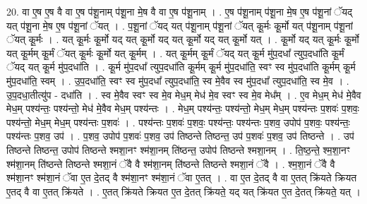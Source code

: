 \documentclass[17pt]{extarticle}
\begin{document}
20. वा ए॒ष ए॒ष वै वा ए॒ष प॑शू॒नाम् प॑शू॒ना मे॒ष वै वा ए॒ष प॑शू॒नाम् । . ए॒ष प॑शू॒नाम् प॑शू॒ना मे॒ष ए॒ष प॑शू॒नां ॅयद् यत् प॑शू॒ना मे॒ष ए॒ष प॑शू॒नां ॅयत् । . प॒शू॒नां ॅयद् यत् प॑शू॒नाम् प॑शू॒नां ॅयत् कू॒र्मः कू॒र्मो यत् प॑शू॒नाम् प॑शू॒नां ॅयत् कू॒र्मः । . यत् कू॒र्मः कू॒र्मो यद् यत् कू॒र्मो यद् यत् कू॒र्मो यद् यत् कू॒र्मो यत् । . कू॒र्मो यद् यत् कू॒र्मः कू॒र्मो यत् कू॒र्मम् कू॒र्मं ॅयत् कू॒र्मः कू॒र्मो यत् कू॒र्मम् । . यत् कू॒र्मम् कू॒र्मं ॅयद् यत् कू॒र्म मु॑प॒दधा᳚ त्युप॒दधा॑ति कू॒र्मं ॅयद् यत् कू॒र्म मु॑प॒दधा॑ति । . कू॒र्म मु॑प॒दधा᳚ त्युप॒दधा॑ति कू॒र्मम् कू॒र्म मु॑प॒दधा॑ति॒ स्वꣳ स्व मु॑प॒दधा॑ति कू॒र्मम् कू॒र्म मु॑प॒दधा॑ति॒ स्वम् । . उ॒प॒दधा॑ति॒ स्वꣳ स्व मु॑प॒दधा᳚ त्युप॒दधा॑ति॒ स्व मे॒वैव स्व मु॑प॒दधा᳚ त्युप॒दधा॑ति॒ स्व मे॒व । . उ॒प॒दधा॒तीत्यु॑प - दधा॑ति । . स्व मे॒वैव स्वꣳ स्व मे॒व मेध॒म् मेध॑ मे॒व स्वꣳ स्व मे॒व मेध᳚म् । . ए॒व मेध॒म् मेध॑ मे॒वैव मेध॒म् पश्य॑न्तः॒ पश्य॑न्तो॒ मेध॑ मे॒वैव मेध॒म् पश्य॑न्तः । . मेध॒म् पश्य॑न्तः॒ पश्य॑न्तो॒ मेध॒म् मेध॒म् पश्य॑न्तः प॒शवः॑ प॒शवः॒ पश्य॑न्तो॒ मेध॒म् मेध॒म् पश्य॑न्तः प॒शवः॑ । . पश्य॑न्तः प॒शवः॑ प॒शवः॒ पश्य॑न्तः॒ पश्य॑न्तः प॒शव॒ उपोप॑ प॒शवः॒ पश्य॑न्तः॒ पश्य॑न्तः प॒शव॒ उप॑ । . प॒शव॒ उपोप॑ प॒शवः॑ प॒शव॒ उप॑ तिष्ठन्ते तिष्ठन्त॒ उप॑ प॒शवः॑ प॒शव॒ उप॑ तिष्ठन्ते । . उप॑ तिष्ठन्ते तिष्ठन्त॒ उपोप॑ तिष्ठन्ते श्मशा॒नꣳ श्म॑शा॒नम् ति॑ष्ठन्त॒ उपोप॑ तिष्ठन्ते श्मशा॒नम् । . ति॒ष्ठ॒न्ते॒ श्म॒शा॒नꣳ श्म॑शा॒नम् ति॑ष्ठन्ते तिष्ठन्ते श्मशा॒नं ॅवै वै श्म॑शा॒नम् ति॑ष्ठन्ते तिष्ठन्ते श्मशा॒नं ॅवै । . श्म॒शा॒नं ॅवै वै श्म॑शा॒नꣳ श्म॑शा॒नं ॅवा ए॒त दे॒तद् वै श्म॑शा॒नꣳ श्म॑शा॒नं ॅवा ए॒तत् । . वा ए॒त दे॒तद् वै वा ए॒तत् क्रि॑यते क्रियत ए॒तद् वै वा ए॒तत् क्रि॑यते । . ए॒तत् क्रि॑यते क्रियत ए॒त दे॒तत् क्रि॑यते॒ यद् यत् क्रि॑यत ए॒त दे॒तत् क्रि॑यते॒ यत् । \newline
\end{document}
